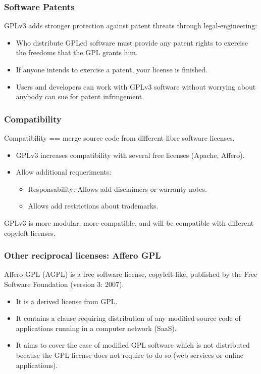 
\begin{frame}
\frametitle{Software Patents}
GPLv3 adds stronger protection against patent threats through legal-engineering:

\begin{itemize}
\item Who distribute GPLed software must provide any patent rights to exercise the freedoms that the GPL grants him.
\item If anyone intends to exercise a patent, your license is finished.
\item Users and developers can work with GPLv3 software without worrying about anybody can sue for patent infringement.
\end{itemize}


\end{frame}


\begin{frame}
\frametitle{Compatibility}

Compatibility == merge source code from different libre software licenses.

\begin{itemize}
\item GPLv3 increases compatibility with several free licenses (Apache, Affero).
\item Allow additional requeriments:
\begin{itemize}
\item Responsability: Allows add disclaimers or warranty notes.
\item Allows add restrictions about trademarks.
\end{itemize}
\end{itemize}

GPLv3 is more modular, more compatible, and will be compatible with different copyleft licenses.

\end{frame}


\begin{frame}
\frametitle{Other reciprocal licenses: Affero GPL}

Affero GPL (AGPL) is a free software license, copyleft-like, published by the Free Software Foundation (version 3: 2007). 

\begin{itemize}
\item It is a derived license from GPL. 
\item It contains a clause requiring distribution of any modified source code of applications running in a computer network (SaaS).
\item It aims to cover the case of modified GPL software which is not distributed because the GPL license does not require to do so (web services or online applications). 
\end{itemize}
\end{frame}


